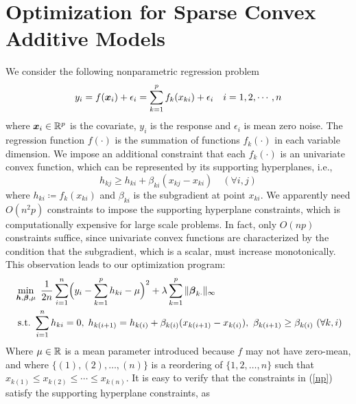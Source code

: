 \section{Optimization for Sparse Convex Additive Models}

We consider the following nonparametric regression problem
\begin{equation}\nonumber
          y_{i} = f(\boldsymbol{x}_{i}) + \epsilon_{i} = 
                  \sum_{k=1}^{p}f_{k}(x_{ki}) + \epsilon_{i} \quad i=1,2,\cdots,n
\end{equation}
where $\boldsymbol{x}_{i}\in\mathbb{R}^{p}$ is the covariate, $y_{i}$ is the
response and $\epsilon_{i}$ is mean zero noise. The regression function $f(\cdot)$ is the summation of 
functions $f_{k}(\cdot)$ in each variable dimension.  
We impose an additional constraint that each $f_{k}(\cdot)$ is 
an univariate convex function, which can be represented by its supporting hyperplanes, i.e.,
\begin{equation}\label{hyper}
      h_{kj} \geq h_{ki} + \beta_{ki}(x_{kj}-x_{ki}) \quad (\forall i,j)
\end{equation}
where $h_{ki}\coloneqq f_{k}(x_{ki})$ and $\beta_{ki}$ is the
subgradient at point $x_{ki}$. We apparently need $O(n^2 p)$ constraints to
impose the supporting hyperplane constraints, which is computationally
expensive for large scale problems.  In fact, only $O(np)$
constraints suffice, since univariate convex functions are
characterized by the condition that the subgradient, which is a scalar, must
increase monotonically. This observation leads to our optimization
program:
\begin{equation}\begin{split}\label{np}
       &\min_{\bds{h},\bds{\beta},\mu} \ \frac{1}{2n}\sum_{i=1}^{n}
                     \Bigl( y_{i}-\sum_{k=1}^{p}h_{ki} - \mu \Bigr)^{2} 
                         + \lambda\sum_{k=1}^{p}\|\bds{\beta}_{k\cdot}\|_{\infty} \\
       &\ \textrm{s.t.} \ \sum_{i=1}^{n}h_{ki}=0,\; h_{k(i+1)} = h_{k(i)} + \beta_{k(i)}(x_{k(i+1)}-x_{k(i)}), 
                                 \ \beta_{k(i+1)} \geq \beta_{k(i)} \ (\forall k, i)
\end{split}\end{equation}
Where $\mu \in {\mathbb R}$ is a mean parameter introduced because $f$ may not have zero-mean, and where $\{(1),(2),\ldots,(n)\}$ is a reordering of $\{1,2,\ldots,n\}$ such that $x_{k(1)}\leq{}x_{k(2)}\leq\cdots\leq{}x_{k(n)}$.  It is easy to verify that the constraints in (\ref{np}) satisfy the supporting hyperplane constraints, as
